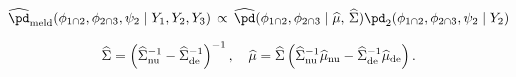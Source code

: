 \begin{equation}
\begin{gathered}
  \widehat{\pd}_{\text{meld}} (\phi_{1 \cap 2}, \phi_{2 \cap 3}, \psi_{2} \mid Y_{1}, Y_{2}, Y_{3})
  \, \propto \,
  \widehat{\pd}(\phi_{1 \cap 2}, \phi_{2 \cap 3} \mid \widehat{\mu}, \, \widehat{\Sigma})
  \pd_{2}(\phi_{1 \cap 2}, \phi_{2 \cap 3}, \psi_{2} \mid Y_{2}) \\[1.5ex] 
  \widehat{\Sigma} = \left(
    \widehat{\Sigma}_{\text{nu}}^{-1} - \widehat{\Sigma}_{\text{de}}^{-1}
  \right)^{-1}, \quad
  \widehat{\mu} = \widehat{\Sigma} \left(
    \widehat{\Sigma}_{\text{nu}}^{-1}\widehat{\mu}_{\text{nu}} - \widehat{\Sigma}_{\text{de}}^{-1}\widehat{\mu}_{\text{de}}
  \right).
\end{gathered}
\label{eqn:final-normal-approx}
\end{equation}